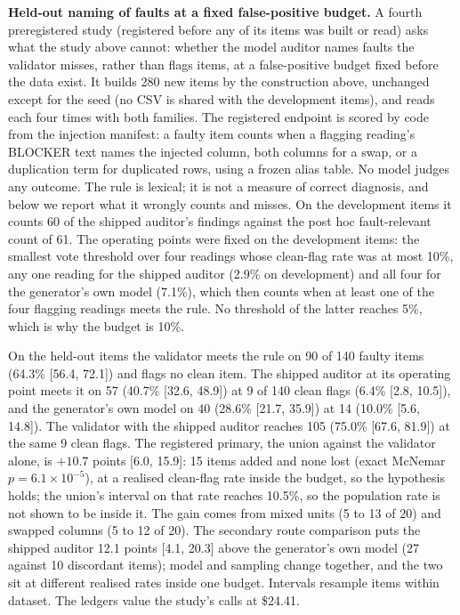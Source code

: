 \textbf{Held-out naming of faults at a fixed false-positive budget.} A fourth preregistered study
(registered before any of its items was built or read) asks what the study above cannot: whether the
model auditor names faults the validator misses, rather than flags items, at a false-positive budget
fixed before the data exist. It builds 280 new items by the construction above, unchanged except for
the seed (no CSV is shared with the development items), and reads each four times with both families.
The registered endpoint is scored by code from the injection manifest: a faulty item counts when a
flagging reading's BLOCKER text names the injected column, both columns for a swap, or a duplication
term for duplicated rows, using a frozen alias table. No model judges any outcome. The rule is lexical;
it is not a measure of correct diagnosis, and below we report what it wrongly counts and misses. On the
development items it counts 60 of the shipped auditor's findings against the post hoc fault-relevant
count of 61. The operating points were fixed on the development items: the smallest vote threshold over
four readings whose clean-flag rate was at most 10\%, any one reading for the shipped auditor (2.9\% on
development) and all four for the generator's own model (7.1\%), which then counts when at least one of
the four flagging readings meets the rule. No threshold of the latter reaches 5\%, which is why the
budget is 10\%.

On the held-out items the validator meets the rule on 90 of 140 faulty items (64.3\% [56.4, 72.1]) and
flags no clean item. The shipped auditor at its operating point meets it on 57 (40.7\% [32.6, 48.9]) at
9 of 140 clean flags (6.4\% [2.8, 10.5]), and the generator's own model on 40 (28.6\% [21.7, 35.9]) at
14 (10.0\% [5.6, 14.8]). The validator with the shipped auditor reaches 105 (75.0\% [67.6, 81.9]) at the
same 9 clean flags. The registered primary, the union against the validator alone, is $+10.7$ points
[6.0, 15.9]: 15 items added and none lost (exact McNemar $p = 6.1\times10^{-5}$), at a realised
clean-flag rate inside the budget, so the hypothesis holds; the union's interval on that rate reaches
10.5\%, so the population rate is not shown to be inside it. The gain comes from mixed units (5 to 13
of 20) and swapped columns (5 to 12 of 20). The secondary route comparison puts the shipped auditor
12.1 points [4.1, 20.3] above the generator's own model (27 against 10 discordant items); model and
sampling change together, and the two sit at different realised rates inside one budget. Intervals
resample items within dataset. The ledgers value the study's calls at \$24.41.


